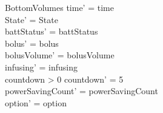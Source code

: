 \begin{schema}{BottomVolumes}
	time' = time\\ State' = State\\
	battStatus' = battStatus\\
	bolus' = bolus\\
	bolusVolume' = bolusVolume\\
	infusing' = infusing\\
	countdown > 0 \land countdown' = 5\\
	powerSavingCount' = powerSavingCount\\ option' = option\\
\end{schema}

